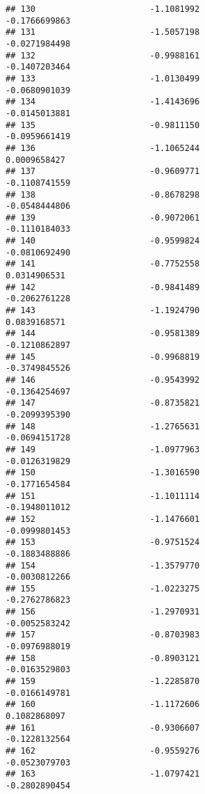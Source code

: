 \documentclass[
]{article}
\begin{document}
\begin{verbatim}
## 130                       -1.1081992                         -0.1766699863
## 131                       -1.5057198                         -0.0271984498
## 132                       -0.9988161                         -0.1407203464
## 133                       -1.0130499                         -0.0680901039
## 134                       -1.4143696                         -0.0145013881
## 135                       -0.9811150                         -0.0959661419
## 136                       -1.1065244                          0.0009658427
## 137                       -0.9609771                         -0.1108741559
## 138                       -0.8678298                         -0.0548444806
## 139                       -0.9072061                         -0.1110184033
## 140                       -0.9599824                         -0.0810692490
## 141                       -0.7752558                          0.0314906531
## 142                       -0.9841489                         -0.2062761228
## 143                       -1.1924790                          0.0839168571
## 144                       -0.9581389                         -0.1210862897
## 145                       -0.9968819                         -0.3749845526
## 146                       -0.9543992                         -0.1364254697
## 147                       -0.8735821                         -0.2099395390
## 148                       -1.2765631                         -0.0694151728
## 149                       -1.0977963                         -0.0126319829
## 150                       -1.3016590                         -0.1771654584
## 151                       -1.1011114                         -0.1948011012
## 152                       -1.1476601                         -0.0999801453
## 153                       -0.9751524                         -0.1883488886
## 154                       -1.3579770                         -0.0030812266
## 155                       -1.0223275                         -0.2762786823
## 156                       -1.2970931                         -0.0052583242
## 157                       -0.8703983                         -0.0976988019
## 158                       -0.8903121                         -0.0163529803
## 159                       -1.2285870                         -0.0166149781
## 160                       -1.1172606                          0.1082868097
## 161                       -0.9306607                         -0.1228132564
## 162                       -0.9559276                         -0.0523079703
## 163                       -1.0797421                         -0.2802890454

\end{verbatim}
\end{document}
